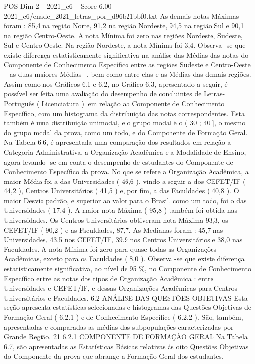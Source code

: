 \begin{textsample}{POS Dim 2 – 2021\_c6 – Score 6.00 – 2021\_c6/enade\_2021\_letras\_por\_d96b21bbf0.txt}
As demais notas Máximas foram : 85,4 na região Norte, 91,2 na região Nordeste, 94,5 na região Sul e 90,1 na região Centro-Oeste.
A nota Mínima foi zero nas regiões Nordeste, Sudeste, Sul e Centro-Oeste.
Na região Nordeste, a nota Mínima foi 3,4.
Observa -se que existe diferença estatisticamente significativa na análise das Médias das notas do Componente de Conhecimento Específico entre as regiões Sudeste e Centro-Oeste – as duas maiores Médias –, bem como entre elas e as Médias das demais regiões.
Assim como nos Gráficos 6.1 e 6.2, no Gráfico 6.3, apresentado a seguir, é possível ser feita uma avaliação do desempenho de concluintes de Letras-Português ( Licenciatura ), em relação ao Componente de Conhecimento Específico, com um histograma da distribuição das notas correspondentes.
Esta também é uma distribuição unimodal, e o grupo modal é o ( 30 ; 40 ], o mesmo do grupo modal da prova, como um todo, e do Componente de Formação Geral.
Na Tabela 6.6, é apresentada uma comparação dos resultados em relação a Categoria Administrativa, a Organização Acadêmica e a Modalidade de Ensino, agora levando -se em conta o desempenho de estudantes do Componente de Conhecimento Específico da prova.
No que se refere a Organização Acadêmica, a maior Média foi a das Universidades ( 46,6 ), vindo a seguir a dos CEFET/IF ( 44,2 ), Centros Universitários ( 41,5 ) e, por fim, a das Faculdades ( 40,8 ).
O maior Desvio padrão, e superior ao valor para o Brasil, como um todo, foi o das Universidades ( 17,4 ).
A maior nota Máxima ( 95,8 ) também foi obtida nas Universidades.
Os Centros Universitários obtiveram nota Máxima 93,3, os CEFET/IF ( 90,2 ) e as Faculdades, 87,7.
As Medianas foram : 45,7 nas Universidades, 43,5 nos CEFET/IF, 39,9 nos Centros Universitários e 38,0 nas Faculdades.
A nota Mínima foi zero para quase todas as Organizações Acadêmicas, exceto para os Faculdades ( 8,0 ).
Observa -se que existe diferença estatisticamente significativa, ao nível de 95 \%, no Componente de Conhecimento Específico entre as notas dos tipos de Organização Acadêmica : entre Universidades e CEFET/IF, e dessas Organizações Acadêmicas para Centros Universitários e Faculdades. 6.2 ANÁLISE DAS QUESTÕES OBJETIVAS Esta seção apresenta estatísticas selecionadas e histogramas das Questões Objetivas de Formação Geral ( 6.2.1 ) e de Conhecimento Específico ( 6.2.2 ).
São, também, apresentadas e comparadas as médias das subpopulações caracterizadas por Grande Região. 21 6.2.1 COMPONENTE DE FORMAÇÃO GERAL Na Tabela 6.7, são apresentadas as Estatísticas Básicas relativas às oito Questões Objetivas do Componente da prova que abrange a Formação Geral dos estudantes.

\end{textsample}
